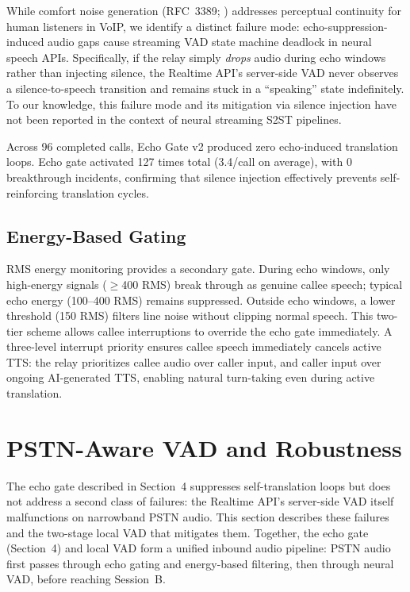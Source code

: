 \documentclass[11pt]{article}
\begin{document}
While comfort noise generation (RFC~3389; \citealt{rfc3389_cn_2002}) addresses perceptual continuity for human listeners in VoIP, we identify a distinct failure mode: echo-suppression-induced audio gaps cause streaming VAD state machine deadlock in neural speech APIs. Specifically, if the relay simply \emph{drops} audio during echo windows rather than injecting silence, the Realtime API's server-side VAD never observes a silence-to-speech transition and remains stuck in a ``speaking'' state indefinitely. To our knowledge, this failure mode and its mitigation via silence injection have not been reported in the context of neural streaming S2ST pipelines.

Across 96 completed calls, Echo Gate v2 produced zero echo-induced translation loops. Echo gate activated 127 times total (3.4/call on average), with 0 breakthrough incidents, confirming that silence injection effectively prevents self-reinforcing translation cycles.

\subsection{Energy-Based Gating}

RMS energy monitoring provides a secondary gate. During echo windows, only high-energy signals ($\geq$400 RMS) break through as genuine callee speech; typical echo energy (100--400 RMS) remains suppressed. Outside echo windows, a lower threshold (150 RMS) filters line noise without clipping normal speech. This two-tier scheme allows callee interruptions to override the echo gate immediately. A three-level interrupt priority ensures callee speech immediately cancels active TTS: the relay prioritizes callee audio over caller input, and caller input over ongoing AI-generated TTS, enabling natural turn-taking even during active translation.


\section{PSTN-Aware VAD and Robustness}

The echo gate described in Section~4 suppresses self-translation loops but does not address a second class of failures: the Realtime API's server-side VAD itself malfunctions on narrowband PSTN audio. This section describes these failures and the two-stage local VAD that mitigates them. Together, the echo gate (Section~4) and local VAD form a unified inbound audio pipeline: PSTN audio first passes through echo gating and energy-based filtering, then through neural VAD, before reaching Session~B.
\end{document}
